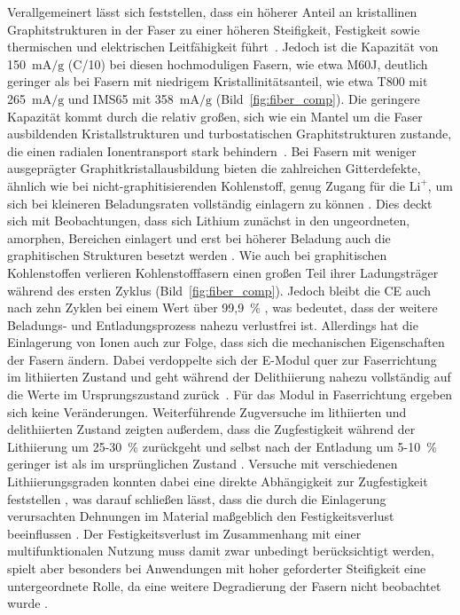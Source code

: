 Verallgemeinert lässt sich feststellen, dass ein höherer Anteil an kristallinen Graphitstrukturen in der Faser zu einer höheren Steifigkeit, Festigkeit sowie thermischen und elektrischen Leitfähigkeit führt~\cite{Zenkert2024}. Jedoch ist die Kapazität von 150~$\si{\mA\per\g}$ (C/10) bei diesen hochmoduligen Fasern, wie etwa M60J, deutlich geringer als bei Fasern mit niedrigem Kristallinitätsanteil, wie etwa T800 mit 265~$\si{\mA\per\g}$ und IMS65 mit 358~$\si{\mA\per\g}$ \cite{Fredi2018} (Bild~\ref{fig:fiber_comp}). Die geringere Kapazität kommt durch die relativ großen, sich wie ein Mantel um die Faser ausbildenden Kristallstrukturen und turbostatischen Graphitstrukturen zustande, die einen radialen Ionentransport stark behindern~\cite{Zenkert2024,He2021}. Bei Fasern mit weniger ausgeprägter Graphitkristallausbildung bieten die zahlreichen Gitterdefekte, ähnlich wie bei nicht-graphitisierenden Kohlenstoff, genug Zugang für die $\text{Li}^{+}$, um sich bei kleineren Beladungsraten vollständig einlagern zu können \cite{Fredi2018}. Dies deckt sich mit Beobachtungen, dass sich Lithium zunächst in den ungeordneten, amorphen, Bereichen einlagert und erst bei höherer Beladung auch die graphitischen Strukturen besetzt werden \cite{Fang2022}. Wie auch bei graphitischen Kohlenstoffen verlieren Kohlenstofffasern einen großen Teil ihrer Ladungsträger während des ersten Zyklus \cite{Jacques2013} (Bild~\ref{fig:fiber_comp}). Jedoch bleibt die CE auch nach zehn Zyklen bei einem Wert über 99,9~\% \cite{Hagberg2016}, was bedeutet, dass der weitere Beladungs- und Entladungsprozess nahezu verlustfrei ist. Allerdings hat die Einlagerung von Ionen auch zur Folge, dass sich die mechanischen Eigenschaften der Fasern ändern. Dabei verdoppelte sich der E-Modul quer zur Faserrichtung im lithiierten Zustand und geht während der Delithiierung nahezu vollständig auf die Werte im Ursprungszustand zurück~\cite{Duan2021}. Für das Modul in Faserrichtung ergeben sich keine Veränderungen. Weiterführende Zugversuche im lithiierten und delithiierten Zustand zeigten außerdem, dass die Zugfestigkeit während der Lithiierung um 25-30~\% zurückgeht und selbst nach der Entladung um 5-10~\% geringer ist als im ursprünglichen Zustand \cite{Jacques2012}. Versuche mit verschiedenen Lithiierungsgraden konnten dabei eine direkte Abhängigkeit zur Zugfestigkeit feststellen \cite{Jacques2014}, was darauf schließen lässt, dass die durch die Einlagerung verursachten Dehnungen im Material maßgeblich den Festigkeitsverlust beeinflussen \cite{Zenkert2024}. Der Festigkeitsverlust im Zusammenhang mit einer multifunktionalen Nutzung muss damit zwar unbedingt berücksichtigt werden, spielt aber besonders bei Anwendungen mit hoher geforderter Steifigkeit eine untergeordnete Rolle, da eine weitere Degradierung der Fasern nicht beobachtet wurde \cite{Zenkert2024}.

